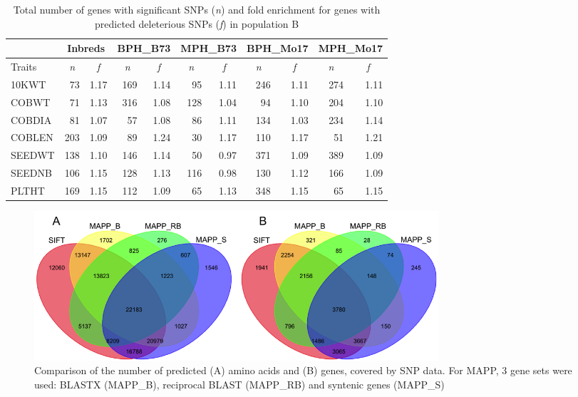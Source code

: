 \documentclass[12pt]{article}
\begin{document}
\begin{table}[ht]
  \begin{center}
    \caption[]{Total number of genes with significant SNPs (\emph{n}) and fold enrichment for genes with predicted deleterious SNPs (\emph{f}) in population B}
{\fontsize{10}{10}\sf
      \begin{tabular}{l|rr|rr|rr|rr|rr} 
\toprule
\multicolumn{1}{c}{}	&	\multicolumn{2}{c}{Inbreds}	&	\multicolumn{2}{c}{BPH\_B73}	&	\multicolumn{2}{c}{MPH\_B73}	&	\multicolumn{2}{c}{BPH\_Mo17}	&	\multicolumn{2}{c}{MPH\_Mo17}	\\	\hline 
Traits	& 	 \multicolumn{1}{c}{\emph{n}} 	& 	\multicolumn{1}{c|}{\emph{f}} 	& 	\multicolumn{1}{c}{\emph{n}} 	& 	\multicolumn{1}{c|}{\emph{f}} 	& 	\multicolumn{1}{c}{\emph{n}} 	& 	\multicolumn{1}{c|}{\emph{f}}	& 	\multicolumn{1}{c}{\emph{n}} 	& 	\multicolumn{1}{c|}{\emph{f}}	& 	\multicolumn{1}{c}{\emph{n}}	&	\multicolumn{1}{c}{\emph{f}}	\\	\hline \hline 
10KWT	&	73	&	1.17	&	169	&	1.14	&	95	&	1.11	&	246	&	1.11	&	274	&	1.11	\\
COBWT	&	71	&	1.13	&	316	&	1.08	&	128	&	1.04	&	94	&	1.10	&	204	&	1.10	\\
COBDIA	&	81	&	1.07	&	57	&	1.08	&	86	&	1.11	&	134	&	1.03	&	234	&	1.14	\\
COBLEN	&	203	&	1.09	&	89	&	1.24	&	30	&	1.17	&	110	&	1.17	&	51	&	1.21	\\
SEEDWT	&	138	&	1.10	&	146	&	1.14	&	50	&	0.97	&	371	&	1.09	&	389	&	1.09	\\
SEEDNB	&	106	&	1.15	&	128	&	1.13	&	116	&	0.98	&	130	&	1.12	&	166	&	1.09	\\
PLTHT	&	169	&	1.15	&	112	&	1.09	&	65	&	1.13	&	348	&	1.15	&	65	&	1.15	\\
\bottomrule
      \end{tabular}
}
    \label{gene_enrichment_B}  
  \end{center}
\end{table}


\begin{figure}[h]
  \begin{center}
   \includegraphics[width=150mm]{VennDiagram.png}
    \caption{Comparison of the number of predicted (A) amino acids and (B) genes, covered by SNP data. For MAPP, 3 gene sets were used: BLASTX (MAPP\_B), reciprocal BLAST (MAPP\_RB) and syntenic genes (MAPP\_S)}
   \label{figureS2}
  \end{center}
\end{figure}
\end{document}
